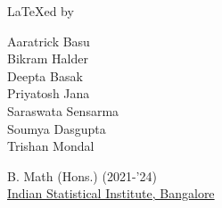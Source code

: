 \documentclass[../Analysis-3.tex]{subfiles}
\begin{document}

\newpage
\thispagestyle{plain}

\phantom{.}

\vfill

\sffamily
{\LARGE {\rm\LaTeX}ed by}

\vspace*{0.5cm}

\large

Aaratrick Basu \\
Bikram Halder \\
Deepta Basak \\
Priyatosh Jana \\
Saraswata Sensarma \\
Soumya Dasgupta \\
Trishan Mondal

\vspace{0.5cm}

B. Math (Hons.) (2021-'24) \\
\href{https://www.isibang.ac.in}{Indian Statistical Institute, Bangalore}
\end{document}
